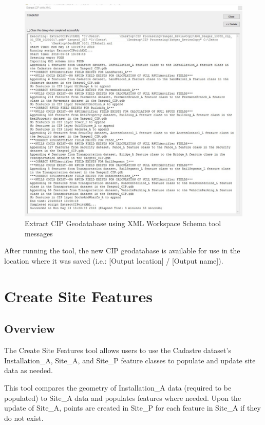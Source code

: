 \documentclass[openany]{book}
\theoremstyle{definition}
\theoremstyle{definition}
\theoremstyle{definition}
\theoremstyle{remark}
\begin{document}
\begin{figure}[H]

{\centering \includegraphics[width=5.07in,]{figures/xCIP-messages} 

}

\caption{Extract CIP Geodatabase using XML Workspace Schema tool messages}\label{fig:xCIPmessages}
\end{figure}

After running the tool, the new CIP geodatabase is available for use in
the location where it was saved (i.e.: {[}Output location{]} / {[}Output
name{]}).

\chapter{Create Site Features}\label{siteData}

\section{Overview}\label{overview-1}

The Create Site Features tool allows users to use the Cadastre dataset's
Installation\_A, Site\_A, and Site\_P feature classes to populate and
update site data as needed.

This tool compares the geometry of Installation\_A data (required to be
populated) to Site\_A data and populates features where needed. Upon the
update of Site\_A, points are created in Site\_P for each feature in
Site\_A if they do not exist.
\end{document}
